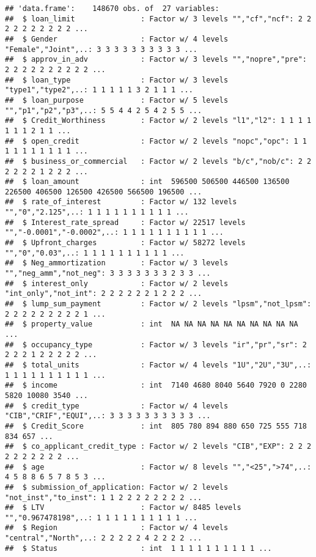 \documentclass[
]{article}
\begin{document}
\begin{verbatim}
## 'data.frame':    148670 obs. of  27 variables:
##  $ loan_limit               : Factor w/ 3 levels "","cf","ncf": 2 2 2 2 2 2 2 2 2 2 ...
##  $ Gender                   : Factor w/ 4 levels "Female","Joint",..: 3 3 3 3 3 3 3 3 3 3 ...
##  $ approv_in_adv            : Factor w/ 3 levels "","nopre","pre": 2 2 2 2 2 2 2 2 2 2 ...
##  $ loan_type                : Factor w/ 3 levels "type1","type2",..: 1 1 1 1 1 3 2 1 1 1 ...
##  $ loan_purpose             : Factor w/ 5 levels "","p1","p2","p3",..: 5 5 4 4 2 5 4 2 5 5 ...
##  $ Credit_Worthiness        : Factor w/ 2 levels "l1","l2": 1 1 1 1 1 1 1 2 1 1 ...
##  $ open_credit              : Factor w/ 2 levels "nopc","opc": 1 1 1 1 1 1 1 1 1 1 ...
##  $ business_or_commercial   : Factor w/ 2 levels "b/c","nob/c": 2 2 2 2 2 2 1 2 2 2 ...
##  $ loan_amount              : int  596500 506500 446500 136500 226500 406500 126500 426500 566500 196500 ...
##  $ rate_of_interest         : Factor w/ 132 levels "","0","2.125",..: 1 1 1 1 1 1 1 1 1 1 ...
##  $ Interest_rate_spread     : Factor w/ 22517 levels "","-0.0001","-0.0002",..: 1 1 1 1 1 1 1 1 1 1 ...
##  $ Upfront_charges          : Factor w/ 58272 levels "","0","0.03",..: 1 1 1 1 1 1 1 1 1 1 ...
##  $ Neg_ammortization        : Factor w/ 3 levels "","neg_amm","not_neg": 3 3 3 3 3 3 3 2 3 3 ...
##  $ interest_only            : Factor w/ 2 levels "int_only","not_int": 2 2 2 2 2 2 1 2 2 2 ...
##  $ lump_sum_payment         : Factor w/ 2 levels "lpsm","not_lpsm": 2 2 2 2 2 2 2 2 2 1 ...
##  $ property_value           : int  NA NA NA NA NA NA NA NA NA NA ...
##  $ occupancy_type           : Factor w/ 3 levels "ir","pr","sr": 2 2 2 2 1 2 2 2 2 2 ...
##  $ total_units              : Factor w/ 4 levels "1U","2U","3U",..: 1 1 1 1 1 1 1 1 1 1 ...
##  $ income                   : int  7140 4680 8040 5640 7920 0 2280 5820 10080 3540 ...
##  $ credit_type              : Factor w/ 4 levels "CIB","CRIF","EQUI",..: 3 3 3 3 3 3 3 3 3 3 ...
##  $ Credit_Score             : int  805 780 894 880 650 725 555 718 834 657 ...
##  $ co_applicant_credit_type : Factor w/ 2 levels "CIB","EXP": 2 2 2 2 2 2 2 2 2 2 ...
##  $ age                      : Factor w/ 8 levels "","<25",">74",..: 4 5 8 8 6 5 7 8 5 3 ...
##  $ submission_of_application: Factor w/ 2 levels "not_inst","to_inst": 1 1 2 2 2 2 2 2 2 2 ...
##  $ LTV                      : Factor w/ 8485 levels "","0.967478198",..: 1 1 1 1 1 1 1 1 1 1 ...
##  $ Region                   : Factor w/ 4 levels "central","North",..: 2 2 2 2 2 4 2 2 2 2 ...
##  $ Status                   : int  1 1 1 1 1 1 1 1 1 1 ...
\end{verbatim}
\end{document}

